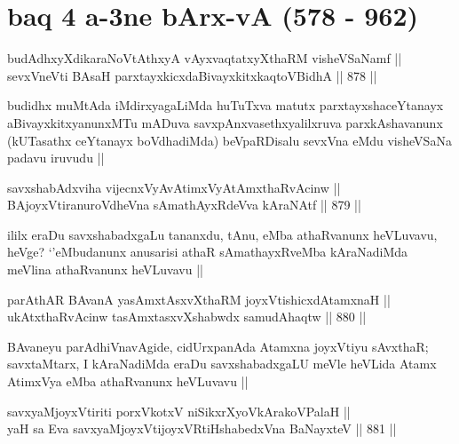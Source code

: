 \section*{baq 4 a-3ne bArx-vA (578 - 962)}


\begin{shl}
budAdhxyXdikaraNoVtAthxyA vAyxvaqtatxyXthaRM visheVSaNamf || \\
sevxVneVti BAsaH parxtayxkicxdaBivayxkitxkaqtoV\s BidhA ||  878 ||  
\end{shl}

\begin{artha}
budidhx muMtAda iMdirxyagaLiMda huTuTxva matutx parxtayxshaceYtanayx aBivayxkitxyanunxMTu mADuva savxpAnxvasethxyalilxruva parxkAshavanunx (kUTasathx ceYtanayx boVdhadiMda) beVpaRDisalu sevxVna eMdu visheVSaNa padavu iruvudu ||
\end{artha}

\begin{shl}
savxshabAdxviha vijecnxVyAvAtimxVyAtAmxthaRvAcinw || \\
BAjoyxVtiranuroVdheVna sAmathAyxRdeVva kAraNAtf ||  879 ||  
\end{shl}

\begin{artha}
ililx eraDu savxshabadxgaLu tananxdu, tAnu, eMba athaRvanunx heVLuvavu, heVge? `\stext'eMbudanunx anusarisi athaR sAmathayxRveMba kAraNadiMda meVlina athaRvanunx heVLuvavu ||
\end{artha}

\begin{shl}
parAthAR BAvanA yasAmxtAsxvXthaRM joyxVtishicxdAtamxnaH || \\
ukAtxthaRvAcinw tasAmxtasxvXshabwdx samudAhaqtw ||  880 ||  
\end{shl}

\begin{artha}
BAvaneyu parAdhiVnavAgide, cidUrxpanAda Atamxna joyxVtiyu sAvxthaR; savxtaMtarx, I kAraNadiMda eraDu savxshabadxgaLU meVle heVLida Atamx AtimxVya eMba athaRvanunx heVLuvavu ||
\end{artha}


\begin{shl}
savxyaMjoyxVtiriti porxVkotxV niSikxrXyoV\s kArakoV\s PalaH || \\
yaH sa Eva savxyaMjoyxVtijoyxVRtiHshabedxVna BaNayxteV ||  881 ||  
\end{shl}

